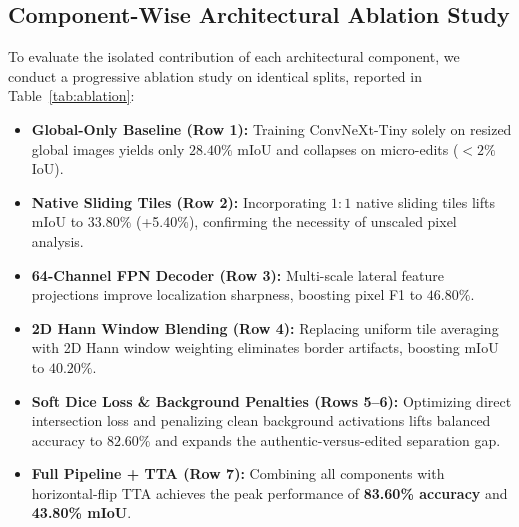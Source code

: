 \documentclass[sigconf,review=true]{acmart}
\begin{document}
\subsection{Component-Wise Architectural Ablation Study}
To evaluate the isolated contribution of each architectural component, we conduct a progressive ablation study on identical splits, reported in Table~\ref{tab:ablation}:
\begin{itemize}
    \item \textbf{Global-Only Baseline (Row 1):} Training ConvNeXt-Tiny solely on resized global images yields only $28.40\%$ mIoU and collapses on micro-edits ($<2\%$ IoU).
    \item \textbf{Native Sliding Tiles (Row 2):} Incorporating $1:1$ native sliding tiles lifts mIoU to $33.80\%$ (+5.40\%), confirming the necessity of unscaled pixel analysis.
    \item \textbf{64-Channel FPN Decoder (Row 3):} Multi-scale lateral feature projections improve localization sharpness, boosting pixel F1 to $46.80\%$.
    \item \textbf{2D Hann Window Blending (Row 4):} Replacing uniform tile averaging with 2D Hann window weighting eliminates border artifacts, boosting mIoU to $40.20\%$.
    \item \textbf{Soft Dice Loss & Background Penalties (Rows 5--6):} Optimizing direct intersection loss and penalizing clean background activations lifts balanced accuracy to $82.60\%$ and expands the authentic-versus-edited separation gap.
    \item \textbf{Full Pipeline + TTA (Row 7):} Combining all components with horizontal-flip TTA achieves the peak performance of \textbf{83.60\% accuracy} and \textbf{43.80\% mIoU}.
\end{itemize}
\end{document}
